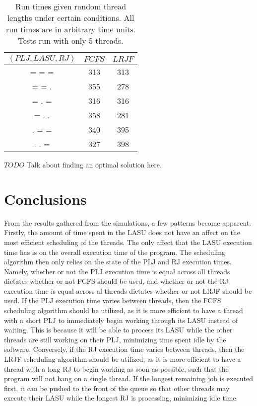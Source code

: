 \documentclass[letterpaper,12pt]{article}
\begin{document}
\begin{table}[ht]
\begin{center}
\caption{Run times given random thread lengths under certain conditions. All run times are in arbitrary time units. Tests run with only 5 threads.}
\begin{tabular}{|c|cc|} 
\hline
\multicolumn{1}{|c|}{$(PLJ, LASU, RJ)$} &
\multicolumn{1}{c}{$FCFS$} &
\multicolumn{1}{c|}{$LRJF$} \\
\hline
= = = & 313 & 313 \\
= = .  & 355 & 278 \\
= . = & 316 & 316 \\
= . . & 358 & 281 \\
. = = & 340 & 395 \\
. . = & 327 & 398 \\
\hline
\end{tabular}
\end{center}
\end{table}

$TODO$ Talk about finding an optimal solution here.  


\section{Conclusions}
From the results gathered from the simulations, a few patterns become apparent.
Firstly, the amount of time spent in the LASU does not have an affect on the most efficient scheduling of the threads.
The only affect that the LASU execution time has is on the overall execution time of the program.
The scheduling algorithm then only relies on the state of the PLJ and RJ execution times.
Namely, whether or not the PLJ execution time is equal across all threads dictates whether or not FCFS should be used, and whether or not the RJ execution time is equal across al threads dictates whether or not LRJF should be used.
If the PLJ execution time varies between threads, then the FCFS scheduling algorithm should be utilized, as it is more efficient to have a thread with a short PLJ to immediately begin working through its LASU instead of waiting.
This is because it will be able to process its LASU while the other threads are still working on their PLJ, minimizing time spent idle by the software.
Conversely, if the RJ execution time varies between threads, then the LRJF scheduling algorithm should be utilized, as it is more efficient to have a thread with a long RJ to begin working as soon as possible, such that the program will not hang on a single thread.
If the longest remaining job is executed first, it can be pushed to the front of the queue so that other threads may execute their LASU while the longest RJ is processing, minimizing idle time.
\end{document}
